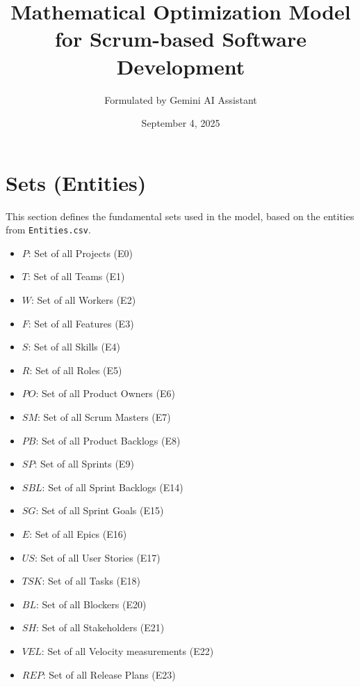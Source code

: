 \documentclass[11pt]{article}
\title{\textbf{Mathematical Optimization Model for Scrum-based Software Development}}
\author{Formulated by Gemini AI Assistant}
\date{September 4, 2025}
\begin{document}
\maketitle
\newpage
\tableofcontents
\newpage

\section{Sets (Entities)}
This section defines the fundamental sets used in the model, based on the entities from \texttt{Entities.csv}.
\begin{itemize}
    \item $P$: Set of all Projects (E0)
    \item $T$: Set of all Teams (E1)
    \item $W$: Set of all Workers (E2)
    \item $F$: Set of all Features (E3)
    \item $S$: Set of all Skills (E4)
    \item $R$: Set of all Roles (E5)
    \item $PO$: Set of all Product Owners (E6)
    \item $SM$: Set of all Scrum Masters (E7)
    \item $PB$: Set of all Product Backlogs (E8)
    \item $SP$: Set of all Sprints (E9)
    \item $SBL$: Set of all Sprint Backlogs (E14)
    \item $SG$: Set of all Sprint Goals (E15)
    \item $E$: Set of all Epics (E16)
    \item $US$: Set of all User Stories (E17)
    \item $TSK$: Set of all Tasks (E18)
    \item $BL$: Set of all Blockers (E20)
    \item $SH$: Set of all Stakeholders (E21)
    \item $VEL$: Set of all Velocity measurements (E22)
    \item $REP$: Set of all Release Plans (E23)
\end{itemize}
\end{document}
